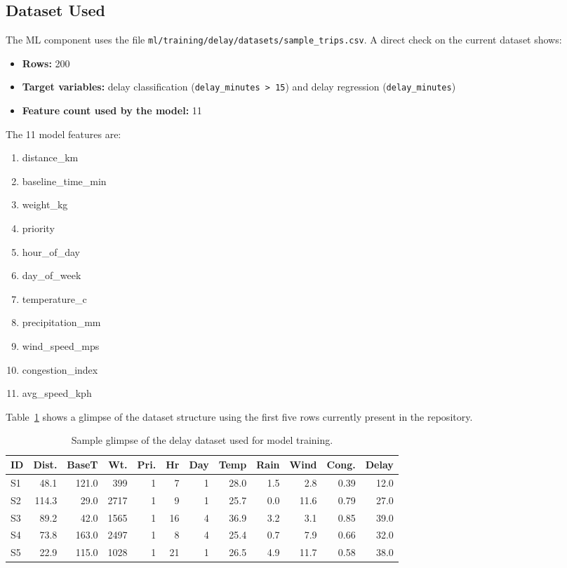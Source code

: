 \subsection{Dataset Used}
The ML component uses the file \texttt{ml/training/delay/datasets/sample\_trips.csv}. A direct check on the current dataset shows:
\begin{itemize}
    \item \textbf{Rows:} 200
    \item \textbf{Target variables:} delay classification (\texttt{delay\_minutes > 15}) and delay regression (\texttt{delay\_minutes})
    \item \textbf{Feature count used by the model:} 11
\end{itemize}

The 11 model features are:
\begin{enumerate}
    \item distance\_km
    \item baseline\_time\_min
    \item weight\_kg
    \item priority
    \item hour\_of\_day
    \item day\_of\_week
    \item temperature\_c
    \item precipitation\_mm
    \item wind\_speed\_mps
    \item congestion\_index
    \item avg\_speed\_kph
\end{enumerate}

Table~\ref{tab:dataset-glimpse} shows a glimpse of the dataset structure using the first five rows currently present in the repository.

\begin{table}[htbp]
\centering
\caption{Sample glimpse of the delay dataset used for model training.}
\label{tab:dataset-glimpse}
\begin{tabular}{lrrrrrrrrrrr}
\toprule
ID & Dist. & BaseT & Wt. & Pri. & Hr & Day & Temp & Rain & Wind & Cong. & Delay \\
\midrule
S1 & 48.1 & 121.0 & 399 & 1 & 7 & 1 & 28.0 & 1.5 & 2.8 & 0.39 & 12.0 \\
S2 & 114.3 & 29.0 & 2717 & 1 & 9 & 1 & 25.7 & 0.0 & 11.6 & 0.79 & 27.0 \\
S3 & 89.2 & 42.0 & 1565 & 1 & 16 & 4 & 36.9 & 3.2 & 3.1 & 0.85 & 39.0 \\
S4 & 73.8 & 163.0 & 2497 & 1 & 8 & 4 & 25.4 & 0.7 & 7.9 & 0.66 & 32.0 \\
S5 & 22.9 & 115.0 & 1028 & 1 & 21 & 1 & 26.5 & 4.9 & 11.7 & 0.58 & 38.0 \\
\bottomrule
\end{tabular}
\end{table}

